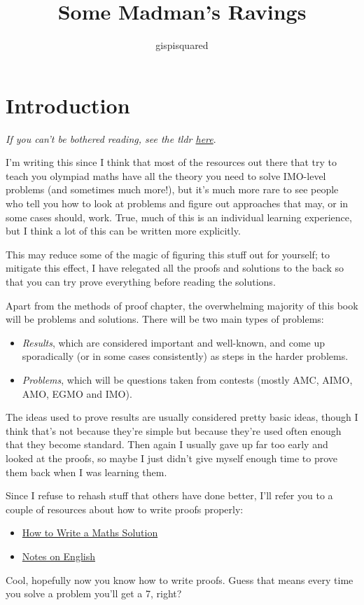 \documentclass{amsart}
\title{Some Madman's Ravings}
\author{gispisquared}
\begin{document}
\maketitle
\tableofcontents
\newpage
\part{Introduction}
\emph{If you can't be bothered reading, see the tldr \hyperlink{tldr}{here}}.

I'm writing this since I think that most of the resources out there that try to
teach you olympiad maths have all the theory you need to solve IMO-level
problems (and sometimes much more!), but it's much more rare to see people who
tell you how to look at problems and figure out approaches that may, or in some
cases should, work. True, much of this is an individual learning experience, but
I think a lot of this can be written more explicitly.

This may reduce some of the magic of figuring this stuff out for yourself; to
mitigate this effect, I have relegated all the proofs and solutions to
the back so that you can try prove everything before reading the solutions.

Apart from the methods of proof chapter, the overwhelming majority of this book
will be problems and solutions. There will be two main types of problems:
\begin{itemize}
  \item \emph{Results}, which are considered important and well-known, and come
    up sporadically (or in some cases consistently) as steps in the harder
    problems.
  \item \emph{Problems}, which will be questions taken from contests (mostly
    AMC, AIMO, AMO, EGMO and IMO).
\end{itemize}
The ideas used to prove results are usually considered pretty
basic ideas, though I think that's not because they're simple but because
they're used often enough that they become standard. Then again I usually gave
up far too early and looked at the proofs, so maybe I just didn't give myself
enough time to prove them back when I was learning them.

Since I refuse to rehash stuff that others have done better, I'll refer you to a
couple of resources about how to write proofs properly:
\begin{itemize}
  \item
    \href{https://artofproblemsolving.com/news/articles/how-to-write-a-solution}
    {How to Write a Maths Solution}
  \item \href{https://web.evanchen.cc/handouts/english/english.pdf}{Notes on
    English}
\end{itemize}
Cool, hopefully now you know how to write proofs. Guess that means every time
you solve a problem you'll get a 7, right?
\end{document}
